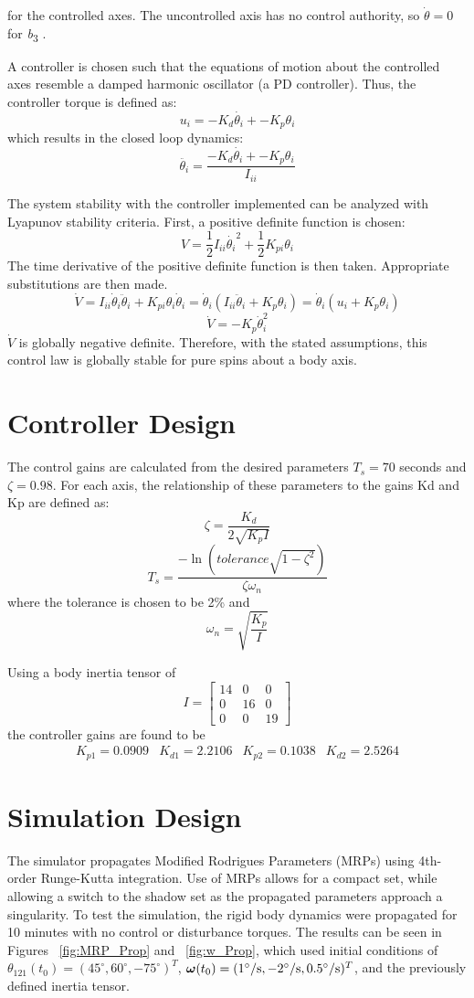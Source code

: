 \documentclass[paper]{aiaaNew}
\begin{document}
for the controlled axes. The uncontrolled axis has no control authority, so $\dot{\theta}=0$ for \textit{b}\textsubscript{3} .

A controller is chosen such that the equations of motion about the controlled axes resemble a damped harmonic oscillator (a PD controller).  Thus, the controller torque is defined as:
\[u_i=-K_d\dot{\theta_i}+-K_p\theta_i\]
which results in the closed loop dynamics:
\[\ddot{\theta_i}=\frac{-K_d\dot{\theta_i}+-K_p\theta_i}{I_{ii}}\]

\par
The system stability with the controller implemented can be analyzed with Lyapunov stability criteria.  First, a positive definite function is chosen:
\[V= \frac{1}{2}I_{ii} \dot{\theta_i}^2 + \frac{1}{2} K_{pi} \theta_i\]
The time derivative of the positive definite function is then taken.  Appropriate substitutions are then made.
\[\dot{V}=I_{ii}\dot\theta_i\ddot\theta_i+K_{pi}\theta_i\dot\theta_i=\dot\theta_i(I_{ii}\ddot\theta_i+K_p\theta_i)=\dot\theta_i(u_i+K_p\theta_i)\]
\[\dot{V}=-K_{p}\dot\theta_{i}^{2}\]
$\dot{V}$ is globally negative definite. Therefore, with the stated assumptions, this control law is globally stable for pure spins about a body axis.


\section{Controller Design}
The control gains are calculated from the desired parameters $T_s = 70$ seconds and $\zeta=0.98$. For each axis, the relationship of these parameters to the gains Kd and Kp are defined as{\cite{IntroToMech}\cite{NiseControl}}:
\[\zeta=\frac{K_d}{2\sqrt{K_pI}}\]
\[T_s=\frac{-\ln(tolerance\sqrt{1-\zeta^2})}{\zeta\omega_n}\]
where the tolerance is chosen to be 2\% and
\[\omega_n=\sqrt{\frac{K_{p}}{I_{}}}\]

Using a body inertia tensor of
\[I=\begin{bmatrix}
14 & 0 & 0\\ 
0 & 16 & 0\\ 
0 & 0 & 19
\end{bmatrix}\]
the controller gains are found to be
\[\begin{matrix}
K_{p1}=0.0909 & K_{d1}=2.2106 & K_{p2}=0.1038 & K_{d2}=2.5264
\end{matrix}\]
\section{Simulation Design}
The simulator propagates Modified Rodrigues Parameters (MRPs) using 4th-order Runge-Kutta integration. Use of MRPs allows for a compact set, while allowing a switch to the shadow set as the propagated parameters approach a singularity\cite{SchaubJunkins}.  To test the simulation, the rigid body dynamics were propagated for 10 minutes with no control or disturbance torques.  The results can be seen in Figures ~\ref{fig:MRP_Prop} and ~\ref{fig:w_Prop}, which used initial conditions of $\theta_{121}(t_0)=(45^{\circ},60^{\circ},-75^{\circ})^T$, $\boldsymbol{\omega}(t_0)=(1^{\circ}/\textup{s},-2^{\circ}/\textup{s},0.5^{\circ}/\textup{s})^T$, and the previously defined inertia tensor.
\end{document}
